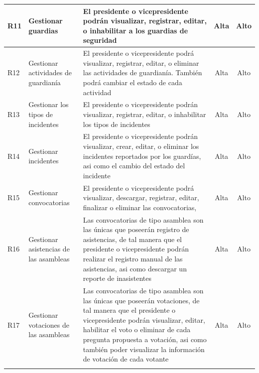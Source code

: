 \begin{footnotesize}
\begin{spacing}{1}
\begin{center}
\begin{longtable}[l]{|p{}|p{}|p{}|p{}| p{}|}
            \hline
            R11         & Gestionar guardias                                & El presidente o vicepresidente podrán visualizar, registrar, editar, o inhabilitar a los guardias de seguridad  & \multicolumn{1}{c|}{Alta} & \multicolumn{1}{c|}{Alto}\\
            \hline
            R12 & Gestionar actividades de guardianía & El presidente o vicepresidente podrá visualizar, registrar, editar, o eliminar las actividades de guardianía.
            También podrá cambiar el estado de cada actividad & \multicolumn{1}{c|}{Alta} & \multicolumn{1}{c|}{Alto}\\
            \hline
            R13         & Gestionar los tipos de incidentes                 & El presidente o vicepresidente podrán visualizar, registrar, editar, o inhabilitar los tipos de incidentes & \multicolumn{1}{c|}{Alta} & \multicolumn{1}{c|}{Alto}\\
            \hline
            R14         & Gestionar incidentes                              & El presidente o vicepresidente podrán visualizar, crear, editar, o eliminar los incidentes reportados por los guardías, asi como el cambio del estado del incidente & \multicolumn{1}{c|}{Alta} & \multicolumn{1}{c|}{Alto}\\
            \hline
            R15         & Gestionar convocatorias                           & El presidente o vicepresidente podrá visualizar, descargar, registrar, editar, finalizar o eliminar las convocatorias,  & \multicolumn{1}{c|}{Alta} & \multicolumn{1}{c|}{Alto}\\
            \hline
            R16         & Gestionar asistencias de las asambleas            & Las convocatorias de tipo asamblea son las únicas que poseerán registro de asistencias, de tal manera que el presidente o vicepresidente podrán realizar el registro manual de las asistencias, asi como descargar un reporte de inasistentes & \multicolumn{1}{c|}{Alta} & \multicolumn{1}{c|}{Alto}\\
            \hline
            R17         & Gestionar votaciones de las asambleas             & Las convocatorias de tipo asamblea son las únicas que poseerán votaciones, de tal manera que el presidente o vicepresidente podrán visualizar, editar, habilitar el voto o eliminar de cada pregunta propuesta a votación, asi como también poder visualizar la información de votación de cada votante & \multicolumn{1}{c|}{Alta} & \multicolumn{1}{c|}{Alto}\\
            \hline
            \newpage
            \hline

\end{longtable}
\end{center}
\end{spacing}
\end{footnotesize}
